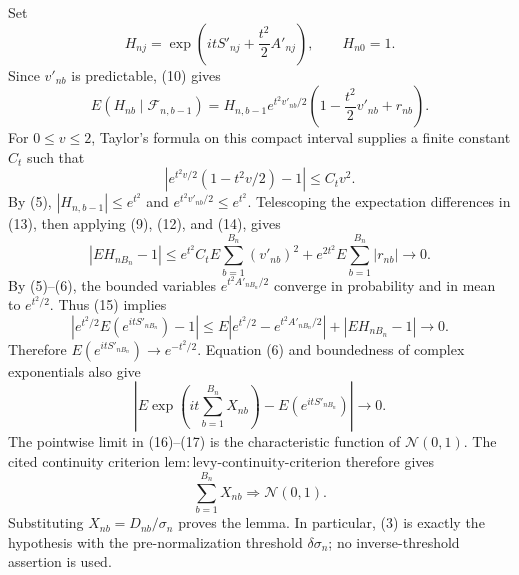 Set
\[
H_{nj}=\exp\!\left(itS'_{nj}+\frac{t^2}{2}A'_{nj}\right),
\qquad H_{n0}=1.
\]
Since \(v'_{nb}\) is predictable, (10) gives
\[
E(H_{nb}\mid\mathcal F_{n,b-1})
=H_{n,b-1}e^{t^2v'_{nb}/2}
\left(1-\frac{t^2}{2}v'_{nb}+r_{nb}\right).
\tag{13}
\]
For \(0\le v\le2\), Taylor's formula on this compact interval supplies a
finite constant \(C_t\) such that
\[
\left|e^{t^2v/2}(1-t^2v/2)-1\right|\le C_tv^2.
\tag{14}
\]
By (5), \(|H_{n,b-1}|\le e^{t^2}\) and
\(e^{t^2v'_{nb}/2}\le e^{t^2}\).  Telescoping the expectation differences
in (13), then applying (9), (12), and (14), gives
\[
|EH_{nB_n}-1|
\le e^{t^2}C_tE\sum_{b=1}^{B_n}(v'_{nb})^2
+e^{2t^2}E\sum_{b=1}^{B_n}|r_{nb}|\longrightarrow0.
\tag{15}
\]
By (5)--(6), the bounded variables \(e^{t^2A'_{nB_n}/2}\) converge in
probability and in mean to \(e^{t^2/2}\).  Thus (15) implies
\[
\left|e^{t^2/2}E(e^{itS'_{nB_n}})-1\right|
\le E\left|e^{t^2/2}-e^{t^2A'_{nB_n}/2}\right|
+|EH_{nB_n}-1|\longrightarrow0.
\tag{16}
\]
Therefore \(E(e^{itS'_{nB_n}})\to e^{-t^2/2}\).  Equation (6) and
boundedness of complex exponentials also give
\[
\left|E\exp\!\left(it\sum_{b=1}^{B_n}X_{nb}\right)
-E(e^{itS'_{nB_n}})\right|\longrightarrow0.
\tag{17}
\]
The pointwise limit in (16)--(17) is the characteristic function of
\(\mathcal N(0,1)\).  The cited continuity criterion
\(\mathrm{lem:levy\text{-}continuity\text{-}criterion}\) therefore gives
\[
\sum_{b=1}^{B_n}X_{nb}\Rightarrow\mathcal N(0,1).
\]
Substituting \(X_{nb}=D_{nb}/\sigma_n\) proves the lemma.  In particular,
(3) is exactly the hypothesis with the pre-normalization threshold
\(\delta\sigma_n\); no inverse-threshold assertion is used.